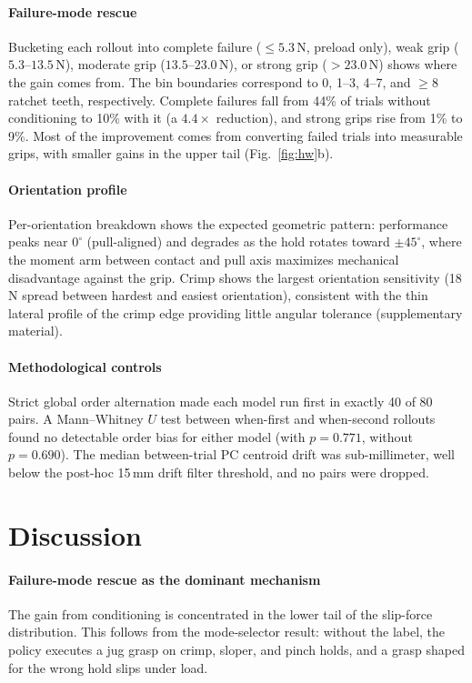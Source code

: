 \documentclass[letterpaper, 10pt, journal, twoside]{IEEEtran}
\begin{document}
\paragraph*{Failure-mode rescue}
Bucketing each rollout into complete failure ($\le 5.3$\,N, preload only), weak grip
($5.3$--$13.5$\,N), moderate grip ($13.5$--$23.0$\,N), or strong grip ($> 23.0$\,N)
shows where the gain comes from. The bin boundaries correspond to
0, 1--3, 4--7, and $\ge 8$ ratchet teeth, respectively. Complete failures fall from 44\% of
trials without conditioning to 10\% with it (a $4.4\times$ reduction), and strong
grips rise from 1\% to 9\%. Most of the improvement comes from converting failed
trials into measurable grips, with smaller gains in the upper tail
(Fig.~\ref{fig:hw}b).

\paragraph*{Orientation profile}
Per-orientation breakdown shows the expected geometric pattern: performance peaks
near $0^\circ$ (pull-aligned) and degrades as the hold rotates toward $\pm 45^\circ$,
where the moment arm between contact and pull axis maximizes mechanical disadvantage
against the grip. Crimp shows the largest orientation sensitivity (18\,N spread
between hardest and easiest orientation), consistent with the thin lateral profile of
the crimp edge providing little angular tolerance (supplementary material).

\paragraph*{Methodological controls}
Strict global order alternation made each model run first in exactly 40 of 80 pairs.
A Mann--Whitney $U$ test between when-first and when-second rollouts found no
detectable order bias for either model (with $p = 0.771$, without $p = 0.690$). The
median between-trial PC centroid drift was sub-millimeter, well below the post-hoc
15\,mm drift filter threshold, and no pairs were dropped.

\section{Discussion}
\label{sec:discussion}

\paragraph*{Failure-mode rescue as the dominant mechanism}
The gain from conditioning is concentrated in the lower tail of the slip-force
distribution. This follows from the mode-selector result: without the label,
the policy executes a jug grasp on crimp, sloper, and pinch holds, and a grasp shaped
for the wrong hold slips under load.
\end{document}
